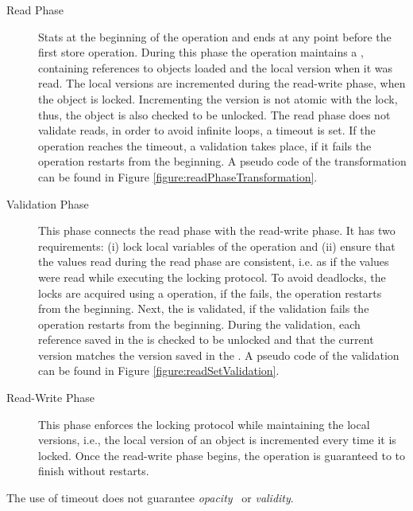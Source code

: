 \begin{description}
  \item[Read Phase] Stats at the beginning of the operation and
  ends at any point before the first store operation. 
  During this phase the operation maintains a \readSet, 
  containing references to objects loaded and the local 
  version when it was read. The local versions are incremented 
  during the read-write phase, when the object is locked. 
  Incrementing the version is not atomic with the lock, thus, 
  the object is also checked to be unlocked. 
  The read phase does not validate reads, 
  in order to avoid infinite loops, a timeout is set. 
  If the operation reaches the timeout, 
  a \readSet validation takes place, if it fails 
  the operation restarts from the beginning.
  A pseudo code of the transformation can be found in 
  Figure \ref{figure:readPhaseTransformation}. 
  
  \item[Validation Phase] This phase connects the read phase
  with the read-write phase. It has two requirements: (i) lock 
  local variables of the operation and (ii) ensure that the 
  values read during the read phase are consistent, i.e.
  as if the values were read while executing the locking 
  protocol. To avoid deadlocks, the locks are acquired using 
  a  operation, if the  fails, 
  the operation restarts from the beginning. Next, the \readSet 
  is validated, if the validation fails the operation restarts from the
  beginning. During the \readSet validation, each reference saved 
  in the \readSet is checked to be unlocked and that the current 
  version matches the version saved in the \readSet. 
  A pseudo code of the \readSet validation can be found in
  Figure \ref{figure:readSetValidation}.
  
  \item[Read-Write Phase] This phase enforces the locking protocol
  while maintaining the local versions, i.e., the local version of 
  an object is incremented every time it is locked.  
  Once the read-write phase begins, the operation is guaranteed to to 
  finish without restarts.  
\end{description}

The use of timeout does not guarantee
\emph{opacity}~\cite{GuerraouiK2008} or 
\emph{validity}\cite{LevAriCK2014}. 

 
